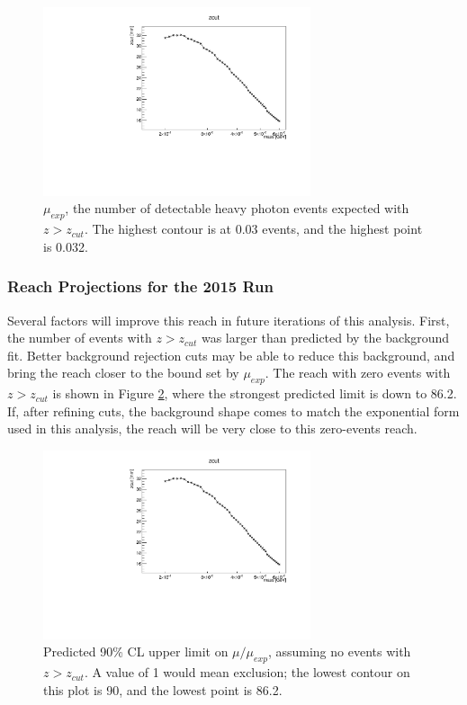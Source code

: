 \begin{figure}[ht]
\begin{center}
    \includegraphics[width=0.7\textwidth,page=16,angle=-90]{vertexing/figs/golden_mres_output}
\end{center}
    \caption{$\mu_{exp}$, the number of detectable heavy photon events expected with $z>z_{cut}$. The highest contour is at 0.03 events, and the highest point is 0.032.}
    \label{fig:detectable}
\end{figure}

\subsubsection{Reach Projections for the 2015 Run}
\label{sec:reach_projections}
Several factors will improve this reach in future iterations of this analysis.
First, the number of events with $z>z_{cut}$ was larger than predicted by the background fit.
Better background rejection cuts may be able to reduce this background, and bring the reach closer to the bound set by $\mu_{exp}$.
The reach with zero events with $z>z_{cut}$ is shown in Figure \ref{fig:upper_limit_nosignal}, where the strongest predicted limit is down to 86.2.
If, after refining cuts, the background shape comes to match the exponential form used in this analysis, the reach will be very close to this zero-events reach.

\begin{figure}[ht]
\begin{center}
    \includegraphics[width=0.7\textwidth,page=15,angle=-90]{vertexing/figs/golden_mres_nosignal_output}
\end{center}
\caption{Predicted 90\% CL upper limit on $\mu/\mu_{exp}$, assuming no events with $z>z_{cut}$. A value of 1 would mean exclusion; the lowest contour on this plot is 90, and the lowest point is 86.2.}
    \label{fig:upper_limit_nosignal}
\end{figure}


